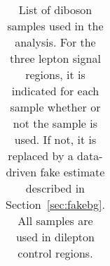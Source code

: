 \begin{table}[ht!]
\begin{footnotesize}
\begin{tabular}{c|c|c|c|c|c|c}
\hline 
\end{tabular}
\end{footnotesize}
\caption{List of diboson samples used in the analysis. 
For the three lepton signal regions, it is indicated for each
sample whether or not the sample is used.  If not, it is replaced
by a data-driven fake estimate described in Section~\ref{sec:fakebg}.
All samples are used in dilepton control regions.
}
\label{tab:sample_bkg_dibosons}
\end{table}


